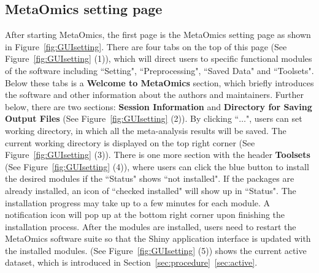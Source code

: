 \subsection{MetaOmics setting page}
\label{sec:setting}
After starting MetaOmics, 
the first page is the MetaOmics setting page as shown in Figure~\ref{fig:GUIsetting}.  
There are four tabs on the top of this page (See Figure~\ref{fig:GUIsetting} {\color{red} (1)}), 
which will direct users to specific functional modules of the software including ``Setting", ``Preprocessing", ``Saved Data" and ``Toolsets".
Below these tabs is a {\bf Welcome to MetaOmics} section, which briefly introduces the software and other information about the authors and maintainers.
Further below, there are two sections: {\bf Session Information} and {\bf Directory for Saving Output Files} (See Figure~\ref{fig:GUIsetting} {\color{red} (2)}).
By clicking ``$\ldots$",
users can set working directory, in which all the meta-analysis results will be saved.
The current working directory is displayed on the top right corner (See Figure~\ref{fig:GUIsetting} {\color{red} (3)}).
There is one more section with the header {\bf Toolsets} (See Figure~\ref{fig:GUIsetting} {\color{red} (4)}),
where users can click the blue button to install the desired modules if the ``Status" shows ``not installed".
If the packages are already installed, an icon of ``checked installed" will show up in ``Status".
The installation progress may take up to a few minutes for each module.
A notification icon will pop up at the bottom right corner upon finishing the installation process. 
After the modules are installed, users need to restart the MetaOmics software suite so that the Shiny application interface is updated with the installed modules.
(See Figure~\ref{fig:GUIsetting} {\color{red} (5)}) shows the current active dataset, 
which is introduced in Section~\ref{sec:procedure}~\ref{sec:active}. 
 
